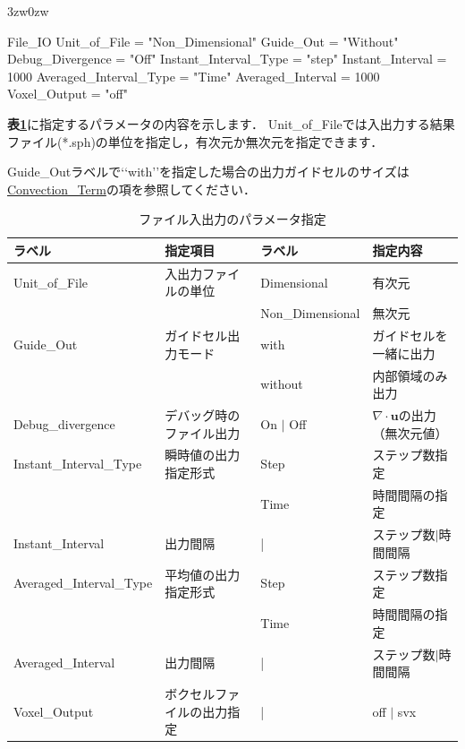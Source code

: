 \begin{indentation}{3zw}{0zw}

{\small
\begin{program}
  File_IO {
    Unit_of_File           = "Non_Dimensional"
    Guide_Out              = "Without"
    Debug_Divergence       = "Off"
    Instant_Interval_Type  = "step"
    Instant_Interval       = 1000
    Averaged_Interval_Type = "Time"
    Averaged_Interval      = 1000
    Voxel_Output           = "off"
  }
\end{program}
}

\textbf{表\ref{tbl:file_IO_parameter}}に指定するパラメータの内容を示します．
Unit\_of\_Fileでは入出力する結果ファイル(*.sph)の単位を指定し，有次元か無次元を指定できます．

Guide\_Outラベルで\lq\lq with\rq\rq を指定した場合の出力ガイドセルのサイズは\hyperlink{tgt:convection_term}{Convection\_Term}の項を参照してください．


\begin{table}[htdp]
\caption{ファイル入出力のパラメータ指定}
\begin{center}
\small
\begin{tabular}{llll} \toprule
ラベル & 指定項目 & ラベル & 指定内容 \\ \midrule
Unit\_of\_File & 入出力ファイルの単位 & Dimensional & 有次元\\
& & Non\_Dimensional & 無次元\\ \hline
Guide\_Out & ガイドセル出力モード & with & ガイドセルを一緒に出力\\
& & without & 内部領域のみ出力\\ \hline
Debug\_divergence & デバッグ時のファイル出力 & On $|$ Off & $\nabla \cdot \bm{u}$の出力（無次元値）\\ \hline
Instant\_Interval\_Type & 瞬時値の出力指定形式 & Step & ステップ数指定\\
& & Time & 時間間隔の指定\\
Instant\_Interval & 出力間隔 & | & ステップ数$|$時間間隔\\ \hline
Averaged\_Interval\_Type & 平均値の出力指定形式 & Step & ステップ数指定\\
& & Time & 時間間隔の指定\\
Averaged\_Interval & 出力間隔 & | & ステップ数$|$時間間隔\\ \hline
Voxel\_Output & ボクセルファイルの出力指定 & | & off $|$ svx\\
\bottomrule
\end{tabular}
\end{center}
\label{tbl:file_IO_parameter}
\end{table}



\end{indentation}
